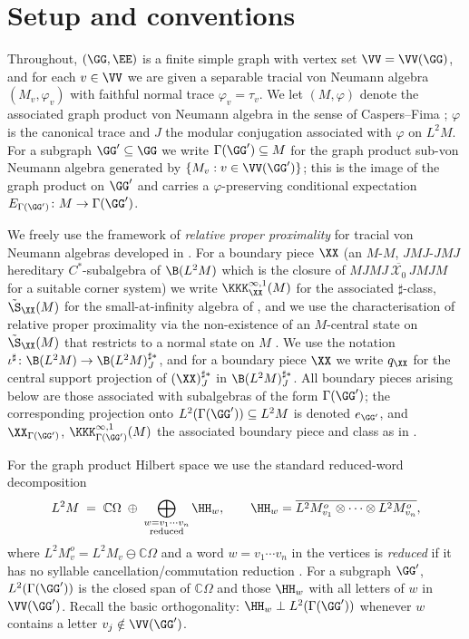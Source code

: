 \section{Setup and conventions}

Throughout, $(\GG,\EE)$ is a finite simple graph with vertex set $\VV=\VV(\GG)$, and for
each $v\in\VV$ we are given a separable tracial von Neumann algebra $(M_v,\varphi_v)$ with
faithful normal trace $\varphi_v=\tau_v$. We let $(M,\varphi)$ denote the associated graph
product von Neumann algebra in the sense of Caspers--Fima \cite{CaFi17}; $\varphi$ is the
canonical trace and $J$ the modular conjugation associated with $\varphi$ on $L^2M$. For a
subgraph $\GG'\subseteq\GG$ we write $\Gamma(\GG')\subseteq M$ for the graph product
sub-von Neumann algebra generated by $\{M_v: v\in\VV(\GG')\}$; this is the image of the
graph product on $\GG'$ and carries a $\varphi$-preserving conditional expectation
$E_{\Gamma(\GG')}\colon M\to\Gamma(\GG')$.

We freely use the framework of \emph{relative proper proximality} for tracial von Neumann
algebras developed in \cite{DKEP23}. For a boundary piece $\XX$ (an $M$-$M$, $JMJ$-$JMJ$
hereditary $C^*$-subalgebra of $\B(L^2M)$ which is the closure of
$\overline{MJMJ\,\mathcal{X}_0\,JMJM}$ for a suitable corner system) we write
$\KKK^{\infty,1}_{\XX}(M)$ for the associated $\sharp$-class, $\tilde\S_{\XX}(M)$ for the
small-at-infinity algebra of \cite[\S8]{DKEP23}, and we use the characterisation of
relative proper proximality via the non-existence of an $M$-central state on
$\tilde\S_{\XX}(M)$ that restricts to a normal state on $M$ \cite[Lemma 8.5]{DKEP23}.
We use the notation $\iota^\sharp\colon\B(L^2M)\to\B(L^2M)^{\sharp*}_J$, and for a boundary
piece $\XX$ we write $q_{\XX}$ for the central support projection of $(\XX)^{\sharp*}_J$ in
$\B(L^2M)^{\sharp*}_J$. All boundary pieces arising below are those associated with
subalgebras of the form $\Gamma(\GG')$; the corresponding projection onto
$L^2(\Gamma(\GG'))\subseteq L^2M$ is denoted $e_{\GG'}$, and $\XX_{\Gamma(\GG')}$,
$\KKK^{\infty,1}_{\Gamma(\GG')}(M)$ the associated boundary piece and class as in
\cite{DKEP23}.

For the graph product Hilbert space we use the standard reduced-word decomposition
\[
L^2M \;=\; \mathbb{C}\Omega \;\oplus\; \bigoplus_{\substack{w=v_1\cdots v_n\\ \text{reduced}}}
\HH_{w},\qquad
\HH_{w}=\overline{L^2M_{v_1}^{o}\otimes\cdots\otimes L^2M_{v_n}^{o}},
\]
where $L^2M_v^{o}=L^2M_v\ominus\mathbb{C}\Omega$ and a word $w=v_1\cdots v_n$ in the vertices
is \emph{reduced} if it has no syllable cancellation/commutation reduction \cite{CaFi17}.
For a subgraph $\GG'$, $L^2(\Gamma(\GG'))$ is the closed span of $\mathbb{C}\Omega$ and those
$\HH_w$ with all letters of $w$ in $\VV(\GG')$. Recall the basic orthogonality:
$\HH_w\perp L^2(\Gamma(\GG'))$ whenever $w$ contains a letter $v_j\notin\VV(\GG')$.

